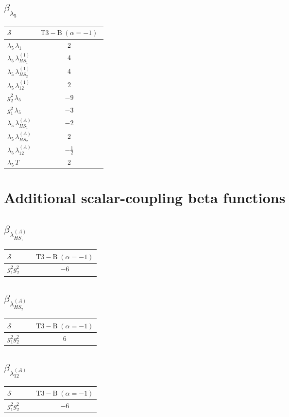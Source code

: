 \documentclass[9pt]{article}
\begin{document}
\subsection*{$ \beta_{\lambda_5} $}
\begin{longtable}{@{}p{0.31\linewidth}c@{}}
\toprule
$\mathcal{S}$ & $ \mathrm{T3-B}\;(\alpha=-1) $ \\
\midrule
$ \lambda_5\,\lambda_1 $ & $ 2 $ \\
$ \lambda_5\,\lambda_{HS_1}^{(1)} $ & $ 4 $ \\
$ \lambda_5\,\lambda_{HS_2}^{(1)} $ & $ 4 $ \\
$ \lambda_5\,\lambda_{12}^{(1)} $ & $ 2 $ \\
$ g_2^2\,\lambda_5 $ & $ -9 $ \\
$ g_1^2\,\lambda_5 $ & $ -3 $ \\
$ \lambda_5\,\lambda_{HS_1}^{(A)} $ & $ -2 $ \\
$ \lambda_5\,\lambda_{HS_2}^{(A)} $ & $ 2 $ \\
$ \lambda_5\,\lambda_{12}^{(A)} $ & $ - \frac{1}{2} $ \\
$ \lambda_5\,T $ & $ 2 $ \\
\bottomrule
\end{longtable}
\section*{Additional scalar-coupling beta functions}
\subsection*{$ \beta_{\lambda_{HS_1}^{(A)}} $}
\begin{longtable}{@{}p{0.31\linewidth}c@{}}
\toprule
$\mathcal{S}$ & $ \mathrm{T3-B}\;(\alpha=-1) $ \\
\midrule
$ g_1^2g_2^2 $ & $ -6 $ \\
\bottomrule
\end{longtable}
\subsection*{$ \beta_{\lambda_{HS_2}^{(A)}} $}
\begin{longtable}{@{}p{0.31\linewidth}c@{}}
\toprule
$\mathcal{S}$ & $ \mathrm{T3-B}\;(\alpha=-1) $ \\
\midrule
$ g_1^2g_2^2 $ & $ 6 $ \\
\bottomrule
\end{longtable}
\subsection*{$ \beta_{\lambda_{12}^{(A)}} $}
\begin{longtable}{@{}p{0.31\linewidth}c@{}}
\toprule
$\mathcal{S}$ & $ \mathrm{T3-B}\;(\alpha=-1) $ \\
\midrule
$ g_1^2g_2^2 $ & $ -6 $ \\
\bottomrule
\end{longtable}
\end{document}
